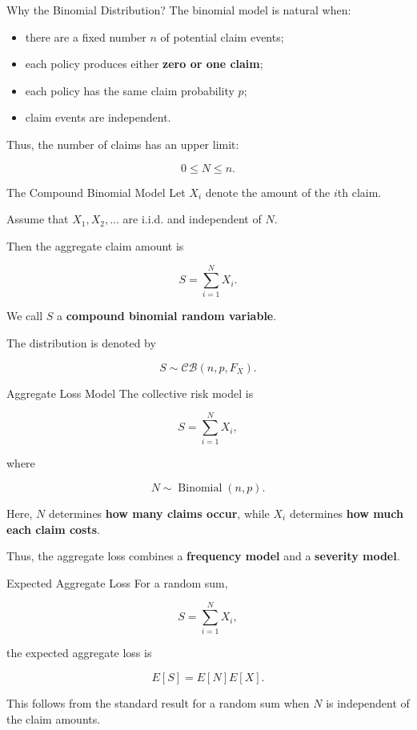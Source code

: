 \documentclass[
  ignorenonframetext,
  aspectratio=169,
]{beamer}
\providecommand{\tightlist}{%
  \setlength{\itemsep}{0pt}\setlength{\parskip}{0pt}}
\begin{document}
\begin{frame}{Why the Binomial Distribution?}
\protect{}\label{why-the-binomial-distribution}
The binomial model is natural when:

\begin{itemize}
\tightlist
\item
  there are a fixed number \(n\) of potential claim events;
\item
  each policy produces either \textbf{zero or one claim};
\item
  each policy has the same claim probability \(p\);
\item
  claim events are independent.
\end{itemize}

Thus, the number of claims has an upper limit:

\[
0 \leq N \leq n.
\]
\end{frame}

\begin{frame}{The Compound Binomial Model}
\protect{}\label{the-compound-binomial-model}
Let \(X_i\) denote the amount of the \(i\)th claim.

Assume that \(X_1,X_2,\ldots\) are i.i.d. and independent of \(N\).

Then the aggregate claim amount is

\[
S=\sum_{i=1}^{N}X_i.
\]

We call \(S\) a \textbf{compound binomial random variable}.

The distribution is denoted by

\[
S\sim\mathcal{CB}(n,p,F_X).
\]
\end{frame}

\begin{frame}{Aggregate Loss Model}
\protect{}\label{aggregate-loss-model}
The collective risk model is

\[
S=\sum_{i=1}^{N}X_i,
\]

where

\[
N\sim\operatorname{Binomial}(n,p).
\]

Here, \(N\) determines \textbf{how many claims occur}, while \(X_i\)
determines \textbf{how much each claim costs}.

Thus, the aggregate loss combines a \textbf{frequency model} and a
\textbf{severity model}.
\end{frame}

\begin{frame}{Expected Aggregate Loss}
\protect{}\label{expected-aggregate-loss}
For a random sum,

\[
S=\sum_{i=1}^{N}X_i,
\]

the expected aggregate loss is

\[
\boxed{E[S]=E[N]E[X]}.
\]

This follows from the standard result for a random sum when \(N\) is
independent of the claim amounts.
\end{frame}
\end{document}
